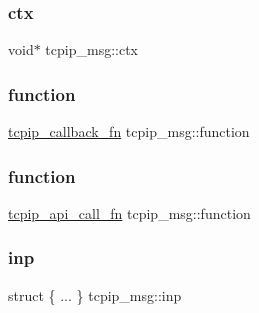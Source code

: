 \mbox{\label{structtcpip__msg_a7edb4f4e181f9cffbef13dc7a7d41d8b}} 
\subsubsection{\texorpdfstring{ctx}{ctx}}
{\footnotesize\ttfamily void$\ast$ tcpip\+\_\+msg\+::ctx}

\mbox{\label{structtcpip__msg_ad294175efea90f55493a9465a65c8e4c}} 
\subsubsection{\texorpdfstring{function}{function}\hspace{0.1cm}{\footnotesize\ttfamily [1/2]}}
{\footnotesize\ttfamily \hyperlink{openmote-cc2538_2lwip_2src_2include_2lwip_2tcpip_8h_a35203296bb838f3b493839ffc6e7285d}{tcpip\+\_\+callback\+\_\+fn} tcpip\+\_\+msg\+::function}

\mbox{\label{structtcpip__msg_a3c72cc53894cab34a142a1ec56b7b59d}} 
\subsubsection{\texorpdfstring{function}{function}\hspace{0.1cm}{\footnotesize\ttfamily [2/2]}}
{\footnotesize\ttfamily \hyperlink{openmote-cc2538_2lwip_2src_2include_2lwip_2priv_2tcpip__priv_8h_aa7ecde8c8d8012fe5c498f7ee58f9458}{tcpip\+\_\+api\+\_\+call\+\_\+fn} tcpip\+\_\+msg\+::function}

\mbox{\label{structtcpip__msg_af7f9b9f211bf2892eae44bb9bf47c30c}} 
\subsubsection{\texorpdfstring{inp}{inp}\hspace{0.1cm}{\footnotesize\ttfamily [1/2]}}
{\footnotesize\ttfamily struct \{ ... \}   tcpip\+\_\+msg\+::inp}

